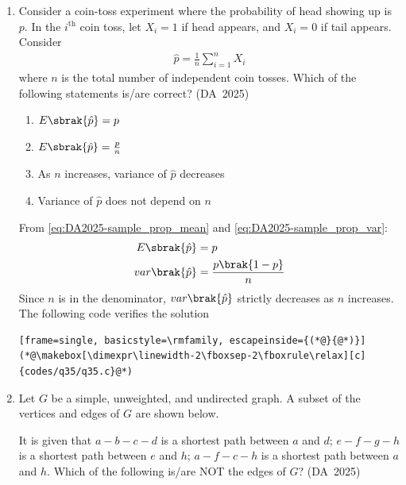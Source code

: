 \begin{enumerate}[label=\thesubsection.\arabic*, ref=\thesubsection.\theenumi]
	\item 
	Consider a coin-toss experiment where the probability of head showing up is $p$. In the $i^{\text{th}}$ coin toss, let $X_i = 1$ if head appears, and $X_i = 0$ if tail appears. Consider
	\begin{align}
		\hat{p} = \frac{1}{n}\sum_{i=1}^n X_i
	\end{align}
	where $n$ is the total number of independent coin tosses. Which of the following statements is/are correct?
	\hfill (DA~2025)
	\begin{enumerate}
		\item $E\sbrak{\hat{p}} = p$
		\item $E\sbrak{\hat{p}} = \frac{p}{n}$
		\item As $n$ increases, variance of $\hat{p}$ decreases
		\item Variance of $\hat{p}$ does not depend on $n$
	\end{enumerate}
	\solution
	From \eqref{eq:DA2025-sample_prop_mean} and \eqref{eq:DA2025-sample_prop_var}:
	\begin{align}
		E\sbrak{\hat{p}} &= p
		\\
		var\brak{\hat{p}} &= \frac{p\brak{1-p}}{n}
	\end{align}
	Since $n$ is in the denominator, $var\brak{\hat{p}}$ strictly decreases as $n$ increases.
	\\
	The following code verifies the solution
	\begin{lstlisting}[frame=single, basicstyle=\rmfamily, escapeinside={(*@}{@*)}]
(*@\makebox[\dimexpr\linewidth-2\fboxsep-2\fboxrule\relax][c]{codes/q35/q35.c}@*)
	\end{lstlisting}
\item 
Let $G$ be a simple, unweighted, and undirected graph. A subset of the vertices and edges of $G$ are shown below.
\begin{figure}[H]
	\centering
	
	\caption{}
	\label{fig:DA-2025-58}
\end{figure}
It is given that $a-b-c-d$ is a shortest path between $a$ and $d$; $e-f-g-h$ is a shortest path between $e$ and $h$; $a-f-c-h$ is a shortest path between $a$ and $h$. Which of the following is/are NOT the edges of $G$?
\hfill (DA~2025)
\begin{enumerate}
\end{enumerate}
\end{enumerate}
